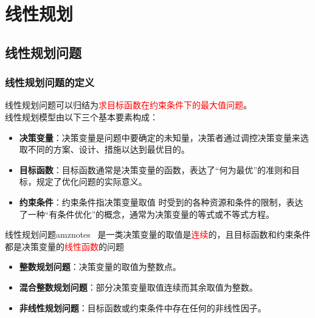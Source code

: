 \ifx\allfiles\undefined

	
	
\else
\fi

    \chapter{线性规划}
    \section{线性规划问题}
    \subsection{线性规划问题的定义}
    线性规划问题可以归结为\textcolor{red}{求目标函数在约束条件下的最大值问题}。\\
    线性规划模型由以下三个基本要素构成：
    \begin{itemize}[noitemsep]
        \item \textbf{决策变量}：决策变量是问题中要确定的未知量，决策者通过调控决策变量来选取不同的方案、设计、措施以达到最优目的。
        \item \textbf{目标函数}：目标函数通常是决策变量的函数，表达了“何为最优”的准则和目标，规定了优化问题的实际意义。
        \item \textbf{约束条件}：约束条件指决策变量取值 时受到的各种资源和条件的限制，表达了一种“有条件优化”的概念，通常为决策变量的等式或不等式方程。
    \end{itemize}

    \begin{dfnbox}{线性规划问题}{amznotes}
         \ 是一类决策变量的取值是\textcolor{red}{连续}的，且目标函数和约束条件都是决策变量的\textcolor{red}{线性函数}的问题
    \end{dfnbox}

    \begin{itemize}[noitemsep]
        \item \textbf{整数规划问题}：决策变量的取值为整数点。
        \item \textbf{混合整数规划问题}：部分决策变量取值连续而其余取值为整数。   
        \item \textbf{非线性规划问题}：目标函数或约束条件中存在任何的非线性因子。
    \end{itemize}

